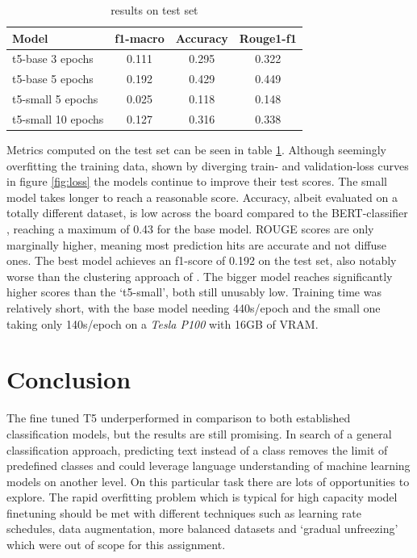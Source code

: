 \documentclass[11pt,a4paper,onecolumn,oneside,notitlepage]{article}
\begin{document}
		\begin{table}
			\begin{center}
				\begin{tabular}{|l|c|c|c|}
					\hline
                    \textbf{Model} & \textbf{f1-macro}  & \textbf{Accuracy} & \textbf{Rouge1-f1}\\
					\hline
					\hline
					\hline
					t5-base 3 epochs & 0.111 & 0.295 & 0.322\\
                    \rowcolor{ForestGreen}
					t5-base 5 epochs & 0.192 & 0.429 & 0.449\\
					\hline
                    t5-small 5 epochs & 0.025 & 0.118 & 0.148\\
                    \hline
					t5-small 10 epochs & 0.127 & 0.316 & 0.338\\
					\hline
				\end{tabular}
			\end{center}
			
			\caption{results on test set}\label{tab1}
		\end{table}


Metrics computed on the test set can be seen in table \ref{tab1}. Although seemingly overfitting the training data, shown by diverging train- and validation-loss curves in figure \ref{fig:loss} the models continue to improve their test scores. The small model takes longer to reach a reasonable score. Accuracy, albeit evaluated on a totally different dataset, is low across the board compared to the BERT-classifier \citep{bert_frame_ident} , reaching  a maximum of 0.43 for the base model. ROUGE scores are only marginally higher, meaning most prediction hits are accurate and not diffuse ones.
The best model achieves an f1-score of 0.192 on the test set, also notably worse than the clustering approach of \citep{webis_task_paper}. The bigger model reaches significantly higher scores than the ‘t5-small’, both still unusably low. Training time was relatively short, with the base model needing 440s/epoch and the small one taking only 140s/epoch on a \textit{Tesla P100} with 16GB of VRAM.


\section{Conclusion}
The fine tuned T5 underperformed in comparison to both established classification models, but the results are still promising. In search of a general classification approach, predicting text instead of a class removes the limit of predefined classes and could leverage language understanding of machine learning models on another level. On this particular task there are lots of opportunities to explore. The rapid overfitting problem which is typical for high capacity model finetuning should be met with different techniques such as learning rate schedules, data augmentation, more balanced datasets and ‘gradual unfreezing’ which were out of scope for this assignment. \\
\end{document}
